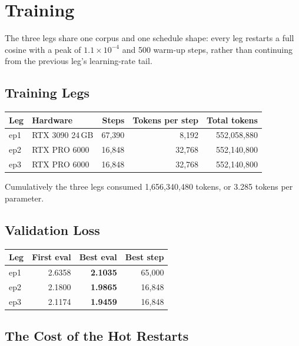 \section{Training}

The three legs share one corpus and one schedule shape: every leg restarts a full cosine with a
peak of $1.1\times10^{-4}$ and 500 warm-up steps, rather than continuing from the previous leg's
learning-rate tail.

\subsection{Training Legs}

\begin{center}\small
\begin{tabular}{@{}llrrr@{}}
\toprule
\textbf{Leg} & \textbf{Hardware} & \textbf{Steps} & \textbf{Tokens per step} & \textbf{Total tokens} \\
\midrule
ep1 & RTX 3090 24\,GB & 67{,}390 & 8{,}192 & 552{,}058{,}880 \\
ep2 & RTX PRO 6000 & 16{,}848 & 32{,}768 & 552{,}140{,}800 \\
ep3 & RTX PRO 6000 & 16{,}848 & 32{,}768 & 552{,}140{,}800 \\
\bottomrule
\end{tabular}
\end{center}

Cumulatively the three legs consumed 1{,}656{,}340{,}480 tokens, or 3.285 tokens per parameter.

\subsection{Validation Loss}

\begin{center}\small
\begin{tabular}{@{}lrrr@{}}
\toprule
\textbf{Leg} & \textbf{First eval} & \textbf{Best eval} & \textbf{Best step} \\
\midrule
ep1 & 2.6358 & \textbf{2.1035} & 65{,}000 \\
ep2 & 2.1800 & \textbf{1.9865} & 16{,}848 \\
ep3 & 2.1174 & \textbf{1.9459} & 16{,}848 \\
\bottomrule
\end{tabular}
\end{center}

\subsection{The Cost of the Hot Restarts}

